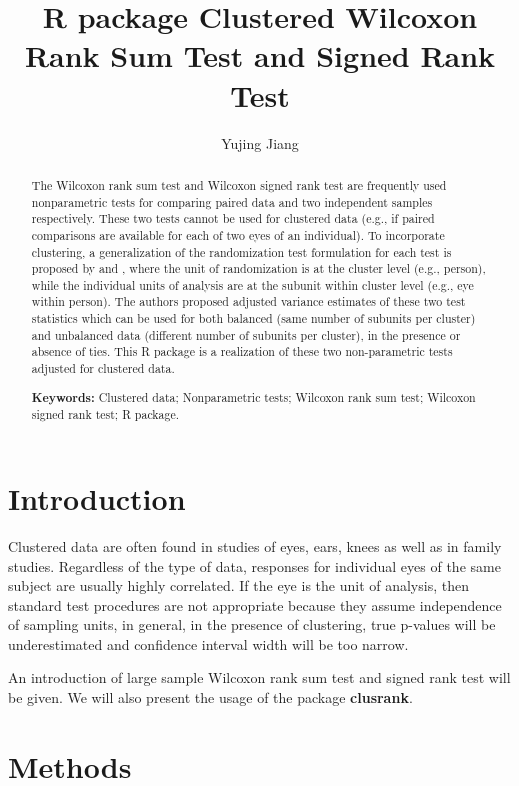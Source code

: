 \documentclass[12pt]{article}
\begin{document}
\title{R package Clustered Wilcoxon Rank Sum Test and Signed Rank Test}
\author{Yujing Jiang}
\maketitle

\begin{abstract}
The Wilcoxon rank sum test and Wilcoxon signed rank test are frequently used nonparametric tests for comparing paired data and two independent samples respectively. These two tests cannot be used for clustered data (e.g., if paired comparisons are available for each of two eyes of an individual). To incorporate clustering, a generalization of the randomization test formulation for each test is proposed by \citep{rosner2003incorporation} and \citep{rosner2006wilcoxon}, where the unit of randomization is at the cluster level (e.g., person), while the individual units of analysis are at the subunit within cluster level (e.g., eye within person). The authors proposed adjusted variance estimates of these two test statistics which can be used for both balanced (same number of subunits per cluster) and unbalanced data (different number of subunits per cluster), in the presence or absence of ties. This R package is a realization of these two non-parametric tests adjusted for clustered data.


\smallskip
\noindent \textbf{Keywords:} Clustered data; Nonparametric tests; Wilcoxon rank sum test; Wilcoxon signed rank test; R package.
\end{abstract}





\section{Introduction}
Clustered data are often found in studies of eyes, ears, knees as well as in family studies. Regardless of the type of data, responses for individual eyes of the same subject are usually highly correlated. If the eye is the unit of analysis, then standard test procedures are not appropriate because they assume independence of sampling units, in general, in the presence of clustering, true p-values will be underestimated and confidence interval width will be too narrow. 

An introduction of large sample Wilcoxon rank sum test and signed rank test will be given. We will also present the usage of the package \textbf{clusrank}.
\section{Methods}
\end{document}
